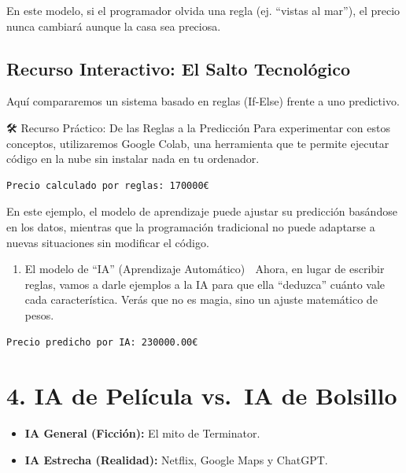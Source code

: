 \documentclass[
  spanish,
  letterpaper,
  DIV=11,
  numbers=noendperiod,
  oneside]{scrreprt}
\providecommand{\tightlist}{%
  \setlength{\itemsep}{0pt}\setlength{\parskip}{0pt}}
\begin{document}
En este modelo, si el programador olvida una regla (ej. ``vistas al
mar''), el precio nunca cambiará aunque la casa sea preciosa.

\subsection{Recurso Interactivo: El Salto
Tecnológico}\label{recurso-interactivo-el-salto-tecnoluxf3gico}

Aquí compararemos un sistema basado en reglas (If-Else) frente a uno
predictivo.

🛠️ Recurso Práctico: De las Reglas a la Predicción Para experimentar con
estos conceptos, utilizaremos Google Colab, una herramienta que te
permite ejecutar código en la nube sin instalar nada en tu ordenador.

\begin{verbatim}
Precio calculado por reglas: 170000€
\end{verbatim}

En este ejemplo, el modelo de aprendizaje puede ajustar su predicción
basándose en los datos, mientras que la programación tradicional no
puede adaptarse a nuevas situaciones sin modificar el código.

\begin{enumerate}
\def\labelenumi{\arabic{enumi}.}
\setcounter{enumi}{1}
\tightlist
\item
  El modelo de ``IA'' (Aprendizaje Automático) 🧠 Ahora, en lugar de
  escribir reglas, vamos a darle ejemplos a la IA para que ella
  ``deduzca'' cuánto vale cada característica. Verás que no es magia,
  sino un ajuste matemático de pesos.
\end{enumerate}

\begin{verbatim}
Precio predicho por IA: 230000.00€
\end{verbatim}

\section{4. IA de Película vs.~IA de
Bolsillo}\label{ia-de-peluxedcula-vs.-ia-de-bolsillo}

\begin{itemize}
\tightlist
\item
  \textbf{IA General (Ficción):} El mito de Terminator.
\item
  \textbf{IA Estrecha (Realidad):} Netflix, Google Maps y ChatGPT.
\end{itemize}
\end{document}
